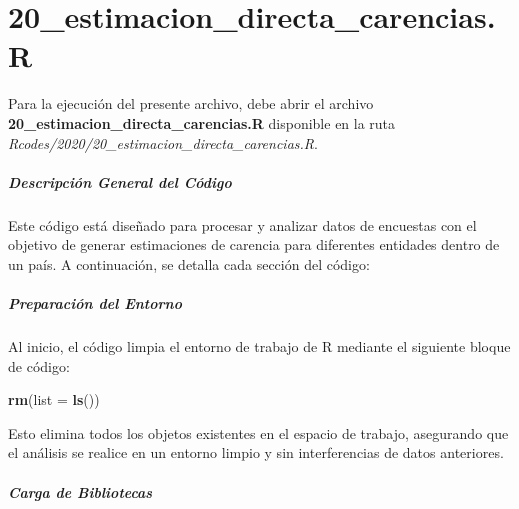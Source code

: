 \documentclass[
  12pt,
]{book}
\newenvironment{Shaded}{\begin{snugshade}}{\end{snugshade}}
\newcommand{\AttributeTok}[1]{\textcolor[rgb]{0.13,0.29,0.53}{#1}}
\newcommand{\FunctionTok}[1]{\textcolor[rgb]{0.13,0.29,0.53}{\textbf{#1}}}
\newcommand{\NormalTok}[1]{#1}
\begin{document}
\hypertarget{estimacion_directa_carencias.r}{%
\chapter*{20\_estimacion\_directa\_carencias.R}\label{estimacion_directa_carencias.r}}

Para la ejecución del presente archivo, debe abrir el archivo \textbf{20\_estimacion\_directa\_carencias.R} disponible en la ruta \emph{Rcodes/2020/20\_estimacion\_directa\_carencias.R}.

\hypertarget{descripciuxf3n-general-del-cuxf3digo}{%
\paragraph*{Descripción General del Código}\label{descripciuxf3n-general-del-cuxf3digo}}

Este código está diseñado para procesar y analizar datos de encuestas con el objetivo de generar estimaciones de carencia para diferentes entidades dentro de un país. A continuación, se detalla cada sección del código:

\hypertarget{preparaciuxf3n-del-entorno-1}{%
\paragraph*{Preparación del Entorno}\label{preparaciuxf3n-del-entorno-1}}

Al inicio, el código limpia el entorno de trabajo de R mediante el siguiente bloque de código:

\begin{Shaded}
\begin{Highlighting}[]
\FunctionTok{rm}\NormalTok{(}\AttributeTok{list =} \FunctionTok{ls}\NormalTok{())}
\end{Highlighting}
\end{Shaded}

Esto elimina todos los objetos existentes en el espacio de trabajo, asegurando que el análisis se realice en un entorno limpio y sin interferencias de datos anteriores.

\hypertarget{carga-de-bibliotecas}{%
\paragraph*{Carga de Bibliotecas}\label{carga-de-bibliotecas}}
\end{document}
